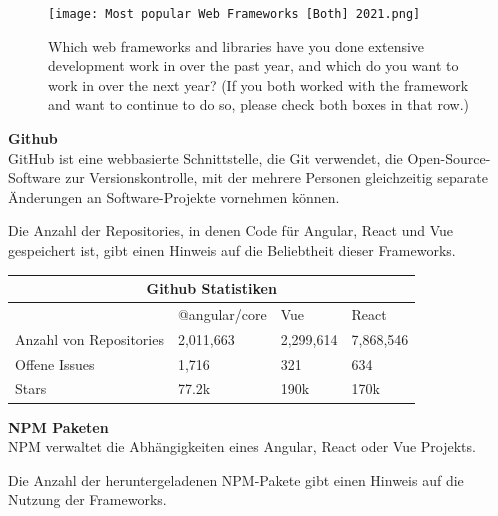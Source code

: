 \begin{figure}
  \centering
\texttt{[image: Most popular Web Frameworks [Both] 2021.png]}
    \caption{ Which web frameworks and libraries have you done extensive development work in over the past year, and which do you want to work in over the next year? (If you both worked with the framework and want to continue to do so, please check both boxes in that row.) {\cite{SO01}}}
    
  \end{figure}

 
 
  \newpage
\begin{flushleft}
\textbf{Github}\\
GitHub ist eine webbasierte Schnittstelle, die Git verwendet, die Open-Source-Software zur Versionskontrolle, mit der mehrere Personen gleichzeitig separate Änderungen an Software-Projekte vornehmen können.
\end{flushleft}

Die Anzahl der Repositories, in denen Code für Angular, React und Vue gespeichert ist, gibt einen Hinweis auf die Beliebtheit dieser Frameworks.
\\
\begin{table}[h!]
  \centering
\begin{tabular}{ |p{3cm}||p{3cm}|p{3.6cm}|p{3.6cm}|  }
  \hline
  \multicolumn{4}{|c|}{Github Statistiken}                                                   \\
  \hline
  &@angular/core & Vue & React  \\
  \hline
  Anzahl von Repositories& 2,011,663 & 2,299,614 & 7,868,546
  \\
  \hline
  Offene Issues& 1,716 & 321 & 634
  \\
  \hline
  Stars& 77.2k & 190k & 170k
  \\
\end{tabular}
\end{table}
{\cite{GH01, GH02, GH03}}


\textbf{NPM Paketen}\\
NPM verwaltet die Abhängigkeiten eines Angular, React oder Vue Projekts.

Die Anzahl der heruntergeladenen NPM-Pakete gibt einen Hinweis auf die Nutzung der Frameworks.

